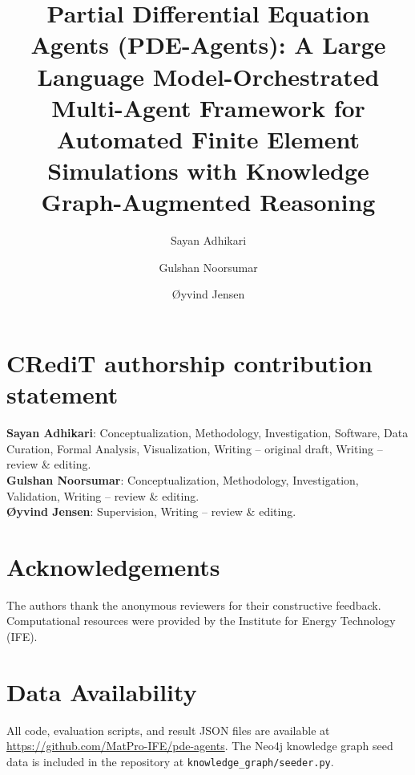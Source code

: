 \documentclass[12pt]{elsarticle}
\begin{document}
\begin{frontmatter}

\title{Partial Differential Equation Agents (PDE-Agents):
       A Large Language Model-Orchestrated Multi-Agent
       Framework for Automated Finite Element Simulations
       with Knowledge Graph-Augmented Reasoning}

\author[ife]{Sayan Adhikari}
\author[ife]{Gulshan Noorsumar}
\author[ife]{\O yvind Jensen}



\end{frontmatter}

\section*{CRediT authorship contribution statement}
\textbf{Sayan Adhikari}: Conceptualization, Methodology, Investigation,
Software, Data Curation, Formal Analysis, Visualization, Writing --
original draft, Writing -- review \& editing.\\
\textbf{Gulshan Noorsumar}: Conceptualization, Methodology, Investigation,
Validation, Writing -- review \& editing.\\
\textbf{\O yvind Jensen}: Supervision, Writing -- review \& editing.

\section*{Acknowledgements}
The authors thank the anonymous reviewers for their constructive feedback.
Computational resources were provided by the Institute for Energy
Technology (IFE).

\section*{Data Availability}
All code, evaluation scripts, and result JSON files are available at
\url{https://github.com/MatPro-IFE/pde-agents}.  The Neo4j knowledge
graph seed data is included in the repository at
\texttt{knowledge\_graph/seeder.py}.
\end{document}
